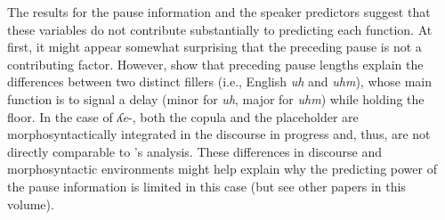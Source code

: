 \documentclass[output=paper,colorlinks,citecolor=brown
\ChapterDOI{10.5281/zenodo.15697581}
]{langscibook}
\begin{document}






The results for the pause information and the speaker predictors suggest that these variables do not contribute substantially to predicting each function. 
At first, it might appear somewhat surprising that the preceding pause is not a contributing factor. 
However, \citet{Clark&FoxTree2002} show that preceding pause lengths explain the differences between two distinct fillers (i.e., English \textit{uh} and \textit{uhm}), whose main function is to signal a delay (minor for \textit{uh}, major for \textit{uhm}) while holding the floor. 
In the case of \textit{ʎe}-, both the copula and the placeholder are morphosyntactically integrated in the discourse in progress and, thus, are not directly comparable to \citet{Clark&FoxTree2002}'s analysis. 
These differences in discourse and morphosyntactic environments might help explain why the predicting power of the pause information is limited in this case (but see other papers in this volume). 

\end{document}
